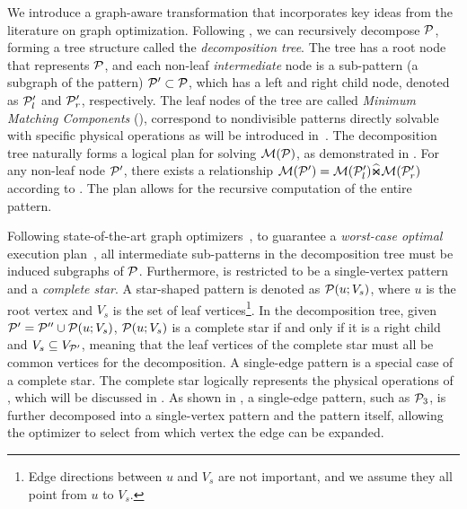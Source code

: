 We introduce a graph-aware transformation that incorporates key ideas from the literature on graph optimization. Following , we can recursively decompose $\mathcal{P}$, forming a tree structure called the \emph{decomposition tree}. The tree has a root node that represents $\mathcal{P}$, and each non-leaf \emph{intermediate} node is a sub-pattern (a subgraph of the pattern) $\mathcal{P}' \subset \mathcal{P}$, which has a left and right child node, denoted as $\mathcal{P}'_l$ and $\mathcal{P}'_r$, respectively. %
The leaf nodes of the tree are called \emph{Minimum Matching Components} (\mmc), correspond to nondivisible patterns directly solvable with specific physical operations
as will be introduced in~. The decomposition tree naturally forms a logical plan for solving $\mathcal{M}(\mathcal{P})$, as demonstrated in . For any non-leaf node $\mathcal{P}'$, there exists a relationship $\mathcal{M}(\mathcal{P}') = \mathcal{M}(\mathcal{P}'_l) \widehat{\Join} \mathcal{M}(\mathcal{P}'_r)$ according to . The plan allows for the recursive computation of the entire pattern.

Following state-of-the-art graph optimizers~\cite{huge,GLogS}, to guarantee a \emph{worst-case optimal} execution plan~\cite{ngo2018worst}, all intermediate sub-patterns in the decomposition tree must be induced subgraphs of $\mathcal{P}$. Furthermore, \mmc is restricted to be a single-vertex pattern and a \emph{complete star}. A star-shaped pattern is denoted as $\mathcal{P}(u;V_s)$, where $u$ is the root vertex and $V_s$ is the set of leaf vertices\footnote{Edge directions between $u$ and $V_s$ are not important, and we assume they all point from $u$ to $V_s$.}. In the decomposition tree, given $\mathcal{P}' = \mathcal{P}'' \cup \mathcal{P}(u;V_s)$, $\mathcal{P}(u;V_s)$ is a complete star if and only if it is a right child and $V_s \subseteq V_{\mathcal{P}'}$, meaning that the leaf vertices of the complete star must all be common vertices for the decomposition. A single-edge pattern is a special case of a complete star. The complete star logically represents the physical operations of \expandintersect, which will be discussed in . As shown in , a single-edge pattern, such as $\mathcal{P}_3$, is further decomposed into a single-vertex pattern and the pattern itself, allowing the optimizer to select from which vertex the edge can be expanded.



